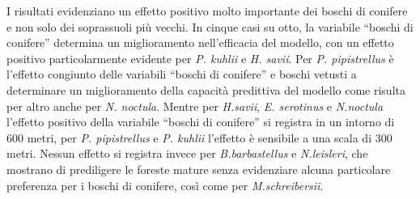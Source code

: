 {I risultati evidenziano un effetto positivo molto importante dei boschi di conifere e non solo dei soprassuoli più vecchi. In cinque casi su otto, la variabile ``boschi di conifere'' determina un miglioramento nell'efficacia del modello, con un effetto positivo particolarmente evidente per \emph{P. kuhlii} e \emph{H. savii}. Per \emph{P. pipistrellus} è l'effetto congiunto delle variabili ``boschi di conifere'' e boschi vetusti a determinare un miglioramento della capacità predittiva del modello come risulta per altro anche per \emph{N. noctula}. Mentre per \emph{H.savii}, \emph{E. serotinus} e \emph{N.noctula} l'effetto positivo della variabile ``boschi di conifere'' si registra in un intorno di 600 metri, per \emph{P. pipistrellus} e \emph{P. kuhlii} l'effetto è sensibile a una scala di 300 metri. Nessun effetto si registra invece per \emph{B.barbastellus} e \emph{N.leisleri}, che mostrano di prediligere le foreste mature senza evidenziare alcuna particolare preferenza per i boschi di conifere, così come per \emph{M.schreibersii}.
} %